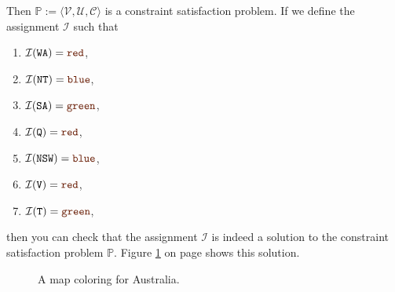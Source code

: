 Then $\mathbb{P} := \langle \mathcal{V}, \mathcal{U}, \mathcal{C} \rangle$ is a constraint satisfaction problem.  
If we define the assignment $\mathcal{I}$ such that
\begin{enumerate}
\item $\mathcal{I}(\mathtt{WA}) = \mytt{red}$,
\item $\mathcal{I}(\mathtt{NT}) = \mytt{blue}$,
\item $\mathcal{I}(\mathtt{SA}) = \mytt{green}$,
\item $\mathcal{I}(\mathtt{Q}) = \mytt{red}$,
\item $\mathcal{I}(\mathtt{NSW}) = \mytt{blue}$,
\item $\mathcal{I}(\mathtt{V}) = \mytt{red}$,
\item $\mathcal{I}(\mathtt{T}) = \mytt{green}$,
\end{enumerate}
then you can check that the assignment $\mathcal{I}$ is indeed a solution to the constraint satisfaction problem $\mathbb{P}$.
Figure \ref{fig:australia-solution.png} on page \pageref{fig:australia-solution.png} shows this solution.

\begin{figure}[!ht]
  \centering
  \caption{A map coloring for Australia.}
  \label{fig:australia-solution.png}
\end{figure}


